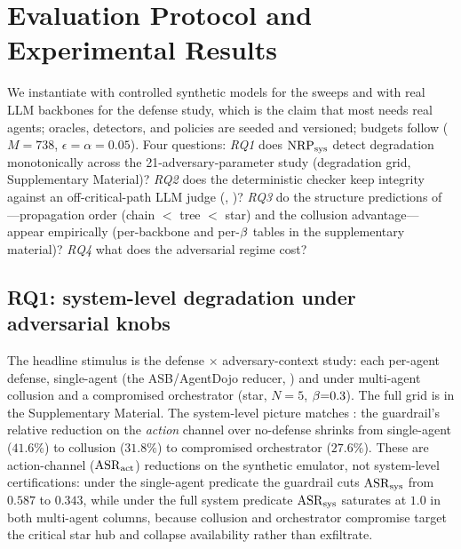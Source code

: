 \section{Evaluation Protocol and Experimental Results}
\label{sec:experiments}

We instantiate  with controlled synthetic models for the sweeps and with real
LLM backbones for the defense study, which is the claim that most needs real agents; oracles,
detectors, and
policies are seeded and versioned; budgets follow  ($M{=}738$,
$\epsilon{=}\alpha{=}0.05$). Four questions: \emph{RQ1} does $\mathrm{NRP}_{\mathrm{sys}}$ detect degradation
monotonically across the 21-adversary-parameter study (degradation grid, Supplementary Material)?
\emph{RQ2} does the deterministic checker keep integrity against an off-critical-path
LLM judge (, )? \emph{RQ3} do the structure
predictions of ---propagation order (chain $<$ tree $<$ star) and the
collusion advantage---appear empirically (per-backbone and per-$\beta$ tables in the
supplementary material)? \emph{RQ4} what does the adversarial regime
cost?

\subsection{RQ1: system-level degradation under adversarial knobs}
The headline stimulus is the defense $\times$ adversary-context study: each per-agent
defense, single-agent (the ASB/AgentDojo reducer, ) and under
multi-agent collusion and a compromised orchestrator (star, $N{=}5$, $\beta{=}0.3$).
The full grid is in the Supplementary Material. The system-level picture matches
: the guardrail's relative reduction on the \emph{action} channel
over no-defense shrinks from single-agent ($41.6\%$) to collusion ($31.8\%$) to
compromised orchestrator ($27.6\%$). These are action-channel ($\mathrm{ASR}_{\mathrm{act}}$) reductions on
the synthetic emulator, not system-level certifications: under the single-agent predicate
the guardrail cuts $\mathrm{ASR}_{\mathrm{sys}}$ from $0.587$ to $0.343$, while under the full system predicate
$\mathrm{ASR}_{\mathrm{sys}}$ saturates at $1.0$ in both multi-agent columns, because collusion and
orchestrator compromise target the critical star hub and collapse availability rather
than exfiltrate.



